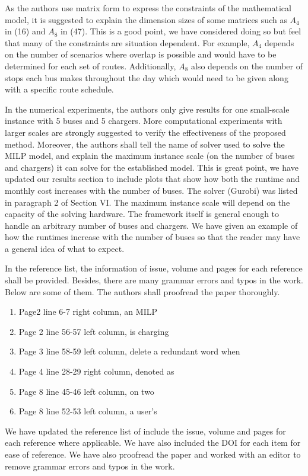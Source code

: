 \documentclass{article}
\begin{document}
\begin{buttkissing}
	\reviewerclaims As the authors use matrix form to express the constraints of the mathematical model, it is suggested to explain the dimension sizes of some matrices such as $A_4$ in (16) and $A_8$ in (47).
	\kissbutt This is a good point, we have considered doing so but feel that many of the constraints are situation dependent. For example, $A_4$ depends on the number of scenarios where overlap is possible and would have to be determined for each set of routes. Additionally, $A_8$ also depends on the number of stops each bus makes throughout the day which would need to be given along with a specific route schedule.

	\reviewerclaims  In the numerical experiments, the authors only give results for one small-scale instance with 5 buses and 5 chargers. More computational experiments with larger scales are strongly suggested to verify the effectiveness of the proposed method. Moreover, the authors shall tell the name of solver used to solve the MILP model, and explain the maximum instance scale (on the number of buses and chargers) it can solve for the established model.
	\kissbutt This is great point, we have updated our results section to include plots that show how both the runtime and monthly cost increases with the number of buses. The solver (Gurobi) was listed in paragraph 2 of Section VI. The maximum  instance scale will depend on the capacity of the solving hardware. The framework itself is general enough to handle an arbitrary number of buses and chargers.  We have given an example of how the runtimes increase with the number of buses so that the reader may have a general idea of what to expect.

	\reviewerclaims  In the reference list, the information of issue, volume and pages for each reference shall be provided.
	Besides, there are many grammar errors and typos in the work. Below are some of them. The authors shall proofread the paper thoroughly.
	\begin{enumerate}
	    \item Page2 line 6-7 right column, an MILP
	    \item Page 2 line 56-57 left column, is charging
	    \item Page 3 line 58-59 left column, delete a redundant word when
	    \item Page 4 line 28-29 right column, denoted as
	    \item Page 8 line 45-46 left column, on two
	    \item Page 8 line 52-53 left column, a user’s
	\end{enumerate} 
	\kissbutt We have updated the reference list of include the issue, volume and pages for each reference where applicable.  We have also included the DOI for each item for ease of reference. We have also proofread the paper and worked with an editor to remove grammar errors and typos in the work.
\end{buttkissing} 
\end{document}
